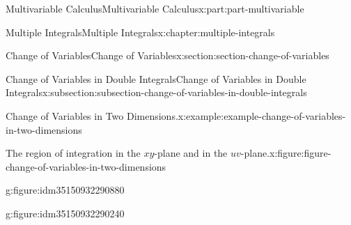 \documentclass[twoside,10pt,]{book}
\numberwithin{equation}{part}
\begin{document}
\begin{partptx}{Multivariable Calculus}{}{Multivariable Calculus}{}{}{x:part:part-multivariable}
\begin{chapterptx}{Multiple Integrals}{}{Multiple Integrals}{}{}{x:chapter:multiple-integrals}
\begin{sectionptx}{Change of Variables}{}{Change of Variables}{}{}{x:section:section-change-of-variables}
\begin{subsectionptx}{Change of Variables in Double Integrals}{}{Change of Variables in Double Integrals}{}{}{x:subsection:subsection-change-of-variables-in-double-integrals}
\begin{example}{Change of Variables in Two Dimensions.}{x:example:example-change-of-variables-in-two-dimensions}
\begin{figureptx}{The region of integration in the \(xy\)-plane and in the \(uv\)-plane.}{x:figure:figure-change-of-variables-in-two-dimensions}{}
\begin{sidebyside}{2}{0}{0}{0}
\begin{sbspanel}{0.5}
\begin{subfigureptx}{}{g:figure:idm35150932290880}{}
{
}%
\tcblower
\end{subfigureptx}%
\end{sbspanel}%
\begin{sbspanel}{0.5}%
\begin{subfigureptx}{}{g:figure:idm35150932290240}{}%
\end{subfigureptx}
\end{sbspanel}
\end{sidebyside}
\end{figureptx}
\end{example}
\end{subsectionptx}
\end{sectionptx}
\end{chapterptx}
\end{partptx}
\end{document}
